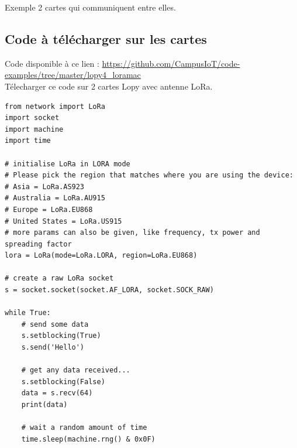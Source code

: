 \documentclass{article}
\begin{document}
Exemple 2 cartes qui communiquent entre elles.
\\


\subsection{Code à télécharger sur les cartes}

Code disponible à ce lien : \url{https://github.com/CampusIoT/code-examples/tree/master/lopy4_loramac}\\








Télecharger ce code sur 2 cartes Lopy avec antenne LoRa.

\begin{verbatim}
from network import LoRa
import socket
import machine
import time

# initialise LoRa in LORA mode
# Please pick the region that matches where you are using the device:
# Asia = LoRa.AS923
# Australia = LoRa.AU915
# Europe = LoRa.EU868
# United States = LoRa.US915
# more params can also be given, like frequency, tx power and spreading factor
lora = LoRa(mode=LoRa.LORA, region=LoRa.EU868)

# create a raw LoRa socket
s = socket.socket(socket.AF_LORA, socket.SOCK_RAW)

while True:
    # send some data
    s.setblocking(True)
    s.send('Hello')

    # get any data received...
    s.setblocking(False)
    data = s.recv(64)
    print(data)

    # wait a random amount of time
    time.sleep(machine.rng() & 0x0F)




\end{verbatim}
\end{document}

